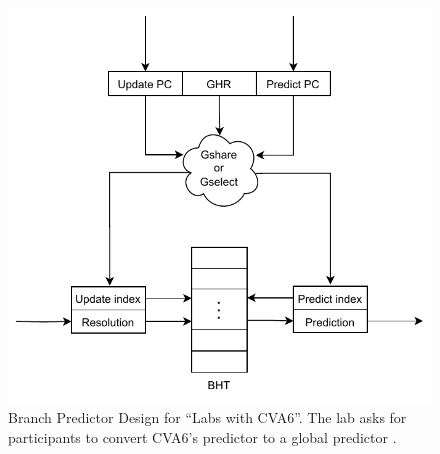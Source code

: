 
\begin{figure}[t]
    \centering
    \includegraphics[width=0.8\linewidth]{media/graphics/labs_with_cva6/global_predictor.pdf}
    \caption[
        Branch Predictor Design for ``Labs with CVA6''
    ]{
        Branch Predictor Design for ``Labs with CVA6''. The lab asks for participants to convert CVA6's predictor to a global predictor \cite{labsWithCVA6}.
    }
    \label{fig:branch_predictor}
\end{figure}
